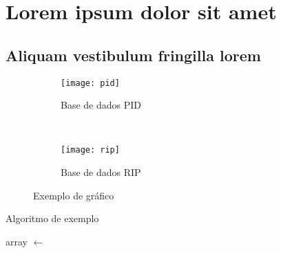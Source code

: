 \chapter{Lorem ipsum dolor sit amet}\label{cap:exampleChapter}
\section{Aliquam vestibulum fringilla lorem}

\lipsum[1]


\lipsum[2-3]


\lipsum[2-3]


\lipsum[2-3]
\begin{figure}
    \centering
    \begin{subfigure}[b]{0.45\textwidth}
        \texttt{[image: pid]}
        \caption{Base de dados PID}
        \label{fig:pid}
    \end{subfigure}
    ~ 
    \begin{subfigure}[b]{0.45\textwidth}
        \texttt{[image: rip]}
        \caption{Base de dados RIP}
        \label{fig:rip}
    \end{subfigure}
    \caption{Exemplo de gráfico}\label{fig:animals}
\end{figure}
\lipsum[2]

\begin{algorithm}
\caption{Algoritmo de exemplo}\label{bogosort}
  \begin{algorithmic}[1]
    \State array $\gets$  
    \EndWhile
  \EndProcedure
  \end{algorithmic}
\end{algorithm}

\lipsum[1]